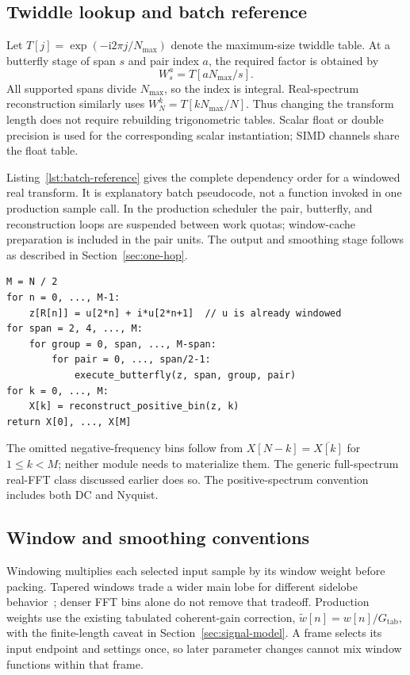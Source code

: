 \subsection{Twiddle lookup and batch reference}
Let $T[j]=\exp(-\mathrm{i}2\pi j/N_{\max})$ denote the maximum-size twiddle
table. At a butterfly stage of span $s$ and pair index $a$, the required
factor is obtained by
\begin{equation}
 W_s^a=T[aN_{\max}/s].
 \label{eq:twiddle-reuse}
\end{equation}
All supported spans divide $N_{\max}$, so the index is integral. Real-spectrum
reconstruction similarly uses $W_N^k=T[kN_{\max}/N]$. Thus changing the
transform length does not require rebuilding trigonometric tables. Scalar
float or double precision is used for the corresponding scalar instantiation;
SIMD channels share the float table.

Listing~\ref{lst:batch-reference} gives the complete dependency order for a
windowed real transform. It is explanatory batch pseudocode, not a function
invoked in one production sample call. In the production scheduler the pair,
butterfly, and reconstruction loops are suspended between work quotas;
window-cache preparation is included in the pair units. The output and
smoothing stage follows as described in Section~\ref{sec:one-hop}.

\begin{lstlisting}[float=tbp,caption={Batch reference for the packed real transform. R is the bit-reversal table for M; butterfly updates use Equation~\eqref{eq:butterfly}, and reconstruction uses Equation~\eqref{eq:real} and its endpoint rules.},label={lst:batch-reference}]
M = N / 2
for n = 0, ..., M-1:
    z[R[n]] = u[2*n] + i*u[2*n+1]  // u is already windowed
for span = 2, 4, ..., M:
    for group = 0, span, ..., M-span:
        for pair = 0, ..., span/2-1:
            execute_butterfly(z, span, group, pair)
for k = 0, ..., M:
    X[k] = reconstruct_positive_bin(z, k)
return X[0], ..., X[M]
\end{lstlisting}

The omitted negative-frequency bins follow from
$X[N-k]=\overline{X[k]}$ for $1\le k<M$; neither module needs to materialize
them. The generic full-spectrum real-FFT class discussed earlier does so.
The positive-spectrum convention includes both DC and Nyquist.

\subsection{Window and smoothing conventions}
Windowing multiplies each selected input sample by its window weight before
packing. Tapered windows trade a wider main lobe for different sidelobe
behavior~\cite{harris1978}; denser FFT bins alone do not remove that tradeoff.
Production weights use the existing tabulated coherent-gain correction,
$\widetilde w[n]=w[n]/G_{\mathrm{tab}}$, with the finite-length caveat in
Section~\ref{sec:signal-model}. A frame selects its input endpoint and
settings once, so later parameter changes cannot mix window functions within
that frame.

